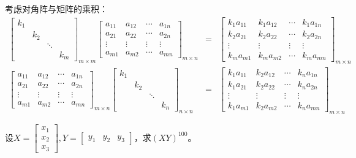 \begin{eg}
考虑对角阵与矩阵的乘积：
\begin{eqnarray*}
\begin{bmatrix}
k_1 & & & \\ & k_2 & & \\ & & \ddots & \\ & & & k_m
\end{bmatrix}_{m\times m}
\begin{bmatrix}
a_{11} & a_{12} & \cdots & a_{1n} \\ a_{21} & a_{22} & \cdots & a_{2n} \\ \vdots & \vdots & \vdots & \vdots \\ a_{m1} & a_{m2} & \cdots & a_{mn}
\end{bmatrix}_{m\times n}
& = & \begin{bmatrix}
k_1 a_{11} & k_1 a_{12} & \cdots & k_1 a_{1n} \\ k_2 a_{21} & k_2 a_{22} & \cdots & k_2 a_{2n} \\ \vdots & \vdots & \vdots & \vdots \\ k_m a_{m1} & k_m a_{m2} & \cdots & k_m a_{mn}
\end{bmatrix}_{m\times n} \\
\begin{bmatrix}
a_{11} & a_{12} & \cdots & a_{1n} \\ a_{21} & a_{22} & \cdots & a_{2n} \\ \vdots & \vdots & \vdots & \vdots \\ a_{m1} & a_{m2} & \cdots & a_{mn}
\end{bmatrix}_{m\times n}
\begin{bmatrix}
k_1 & & & \\ & k_2 & & \\ & & \ddots & \\ & & & k_n
\end{bmatrix}_{n\times n}
& = & \begin{bmatrix}
k_1 a_{11} & k_2 a_{12} & \cdots & k_n a_{1n} \\ k_1 a_{21} & k_2 a_{22} & \cdots & k_n a_{2n} \\ \vdots & \vdots & \vdots & \vdots \\ k_1 a_{m1} & k_2 a_{m2} & \cdots & k_n a_{mn}
\end{bmatrix}_{m\times n}
\end{eqnarray*}
\end{eg}

\begin{eg}
设$X = \begin{bmatrix} x_1 \\ x_2 \\ x_3 \end{bmatrix}, Y = \begin{bmatrix} y_1 & y_2 & y_3 \end{bmatrix}$，求$(XY)^{100}$。
\end{eg}

